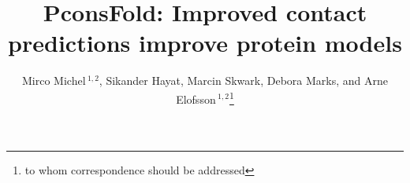 \documentclass{bioinfo}
\begin{document}

\title[PconsFold]{PconsFold: Improved contact predictions improve
  protein models}
\author[M.Michel \textit{et~al}]{Mirco Michel\,$^{1,2}$, Sikander Hayat, Marcin Skwark, Debora Marks, and Arne Elofsson\,$^{1,2}$\footnote{to whom correspondence should be addressed}}
\address{$^{1}$Department of Biochemistry and Biophysics, Stockholm University, 10691 Stockholm, Sweden\\
$^{2}$Science for Life Laboratory, Box 1031, 17121 Solna, Sweden\\
AFFILIATIONS}



\maketitle
\end{document}
